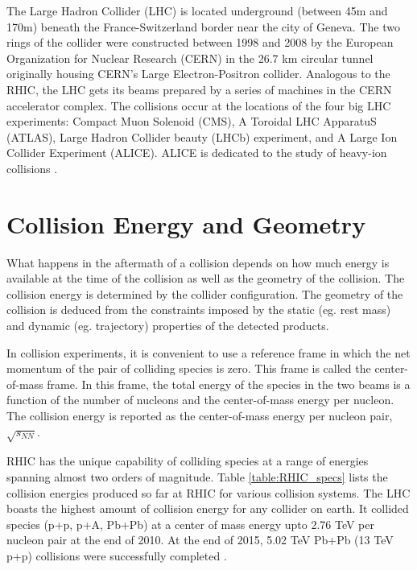 The Large Hadron Collider (LHC) is located underground (between 45m and 170m) beneath the France-Switzerland border near the city of  Geneva. The two rings of the collider were constructed between 1998 and 2008 by the European Organization for Nuclear Research (CERN) in the 26.7 km circular tunnel originally housing CERN's Large Electron-Positron collider. Analogous to the RHIC, the LHC gets its beams prepared by a series of machines in the CERN accelerator complex. The collisions occur at the locations of the four big LHC experiments: Compact Muon Solenoid (CMS), A Toroidal LHC ApparatuS (ATLAS), Large Hadron Collider beauty (LHCb) experiment, and A Large Ion Collider Experiment (ALICE). ALICE is dedicated to the study of heavy-ion collisions \cite{1748-0221-3-08-S08001}.

\section{Collision Energy and Geometry}
What happens in the aftermath of a collision depends on how much energy is available at the time of the collision as well as the geometry of the collision. The collision energy is determined by the collider configuration. The geometry of the collision is deduced from the constraints imposed by the static (eg. rest mass) and dynamic (eg. trajectory) properties of the detected products.

In collision experiments, it is convenient to use a reference frame in which the net momentum of the pair of colliding species is zero. This frame is called the center-of-mass frame. In this frame, the total energy of the species in the two beams is a function of the number of nucleons and the center-of-mass energy per nucleon. The collision energy is reported as the center-of-mass energy per nucleon pair, $\sqrt{s_{NN}}$. %


RHIC has the unique capability of colliding species at a range of energies spanning almost two orders of magnitude. Table \ref{table:RHIC_specs} lists the collision energies produced so far at RHIC for various collision systems. The LHC boasts the highest amount of collision energy for any collider on earth. It collided species (p+p, p+A, Pb+Pb) at a center of mass energy upto 2.76 TeV per nucleon pair at the end of 2010. At the end of 2015, 5.02 TeV Pb+Pb (13 TeV p+p) collisions were successfully completed \cite{FOKA2016154}.


